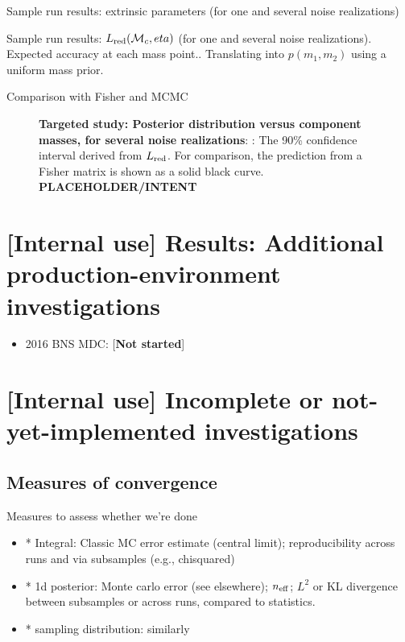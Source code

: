 Sample run results: extrinsic parameters (for one and several noise realizations)

Sample run results: $L_{\rm red}({{\cal M}_c},eta)$ (for one and several noise realizations). Expected accuracy at each mass
point.. Translating into  $p(m_1,m_2)$ using a uniform mass prior.

Comparison with Fisher and MCMC


\begin{figure}
\caption{\label{fig:TargetedEvent:LikelihoodVersusMchirpEta}\textbf{Targeted study: Posterior distribution
    versus component masses, for several noise realizations}: : The 90\% confidence interval derived from $L_{\rm red}$.  For
comparison, the prediction from a Fisher matrix is shown as a solid black curve.
 \textbf{PLACEHOLDER/INTENT}
}
\end{figure}


\section{[Internal use] Results: Additional production-environment investigations}

\begin{itemize}
\item 2016 BNS MDC: [\textbf{Not started}]

\end{itemize}

\section{[Internal use] Incomplete or not-yet-implemented investigations}

\subsection{Measures of convergence}

Measures to assess whether we're done
\begin{itemize}
\item * Integral: Classic MC error estimate (central limit); reproducibility across runs and via subsamples (e.g., chisquared)

\item * 1d posterior:  Monte carlo error (see elsewhere); $n_{\rm eff}$; $L^2$ or KL divergence between subsamples or
  across runs, compared to statistics.

\item * sampling distribution: similarly
\end{itemize}


